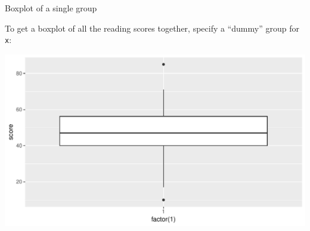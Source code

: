 \begin{frame}[fragile]{Boxplot of a single group}
  
  To get a boxplot of all the reading scores together, specify a
  ``dummy'' group for \texttt{x}:
  
\begin{knitrout}
\color{fgcolor}\begin{kframe}
\begin{alltt}
\hlstd{(}\hlstd{=}\hlstd{(}\hlstd{),}\hlopt{+}\hlstd{()}
\end{alltt}
\end{kframe}
\includegraphics[width=\maxwidth]{figure/cateloupe-1} 

\end{knitrout}
  
\end{frame}

